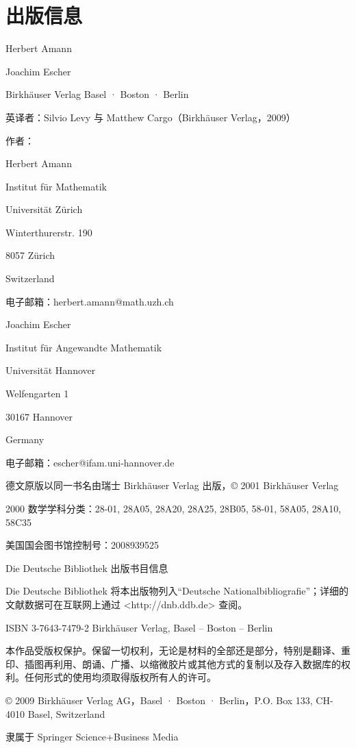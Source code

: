 \chapter*{出版信息}

Herbert Amann

Joachim Escher

Birkhäuser Verlag Basel · Boston · Berlin

英译者：Silvio Levy 与 Matthew Cargo（Birkhäuser Verlag，2009）

作者：

Herbert Amann

Institut für Mathematik

Universität Zürich

Winterthurerstr. 190

8057 Zürich

Switzerland

电子邮箱：herbert.amann@math.uzh.ch

Joachim Escher

Institut für Angewandte Mathematik

Universität Hannover

Welfengarten 1

30167 Hannover

Germany

电子邮箱：escher@ifam.uni-hannover.de

德文原版以同一书名由瑞士 Birkhäuser Verlag 出版，© 2001 Birkhäuser Verlag

2000 数学学科分类：28-01, 28A05, 28A20, 28A25, 28B05, 58-01, 58A05, 28A10, 58C35

美国国会图书馆控制号：2008939525

Die Deutsche Bibliothek 出版书目信息

Die Deutsche Bibliothek 将本出版物列入“Deutsche Nationalbibliografie”；详细的文献数据可在互联网上通过 <http://dnb.ddb.de> 查阅。

ISBN 3-7643-7479-2 Birkhäuser Verlag, Basel – Boston – Berlin

本作品受版权保护。保留一切权利，无论是材料的全部还是部分，特别是翻译、重印、插图再利用、朗诵、广播、以缩微胶片或其他方式的复制以及存入数据库的权利。任何形式的使用均须取得版权所有人的许可。

© 2009 Birkhäuser Verlag AG，Basel · Boston · Berlin，P.O. Box 133, CH-4010 Basel, Switzerland

隶属于 Springer Science+Business Media

